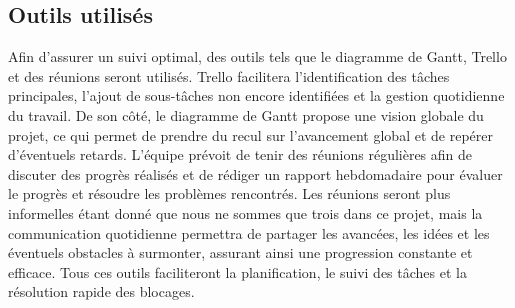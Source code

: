 \subsection{Outils utilisés}

Afin d'assurer un suivi optimal, des outils tels que le diagramme de Gantt, 
Trello et des réunions seront utilisés. Trello facilitera l'identification des 
tâches principales, l'ajout de sous-tâches non encore identifiées et la gestion 
quotidienne du travail. De son côté, le diagramme de Gantt propose une vision 
globale du projet, ce qui permet de prendre du recul sur l'avancement global et 
de repérer d'éventuels retards. L'équipe prévoit de tenir des réunions régulières 
afin de discuter des progrès réalisés et de rédiger un rapport hebdomadaire pour 
évaluer le progrès et résoudre les problèmes rencontrés. Les réunions seront plus 
informelles étant donné que nous ne sommes que trois dans ce projet, mais la 
communication quotidienne permettra de partager les avancées, les idées et les 
éventuels obstacles à surmonter, assurant ainsi une progression constante et 
efficace. Tous ces outils faciliteront la planification, le suivi des tâches et 
la résolution rapide des blocages.